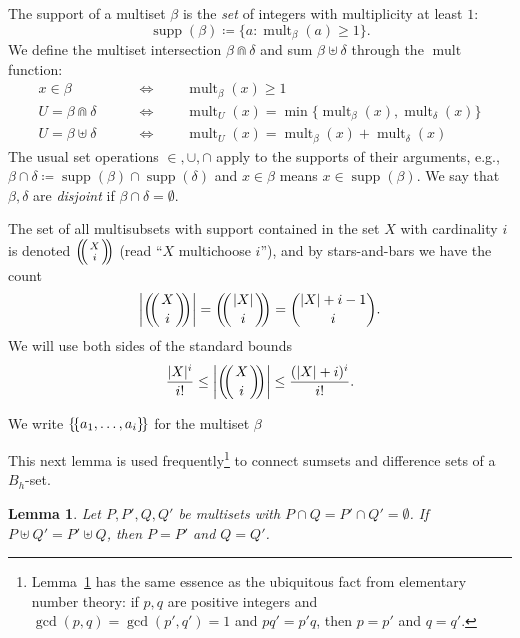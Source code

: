 \documentclass[10pt,letterpaper]{article}
\DeclarePairedDelimiter{\abs}{\lvert}{\rvert}
\DeclarePairedDelimiter{\multi}{\{\!\{}{\}\!\}}
\newcommand{\multibinom}[2]{\left(\kern-0.3em\left(\genfrac{}{}{0pt}{}{#1}{#2}\right)\kern-0.3em\right)}
\DeclareMathOperator{\supp}{supp}
\DeclareMathOperator{\mult}{mult}
\newtheorem{lem}[thm]{Lemma}
\theoremstyle{remark}
\begin{document}
The support of a multiset $\beta$ is the \emph{set} of integers with multiplicity at least $1$:
  \[\supp(\beta) \coloneqq \{ a : \mult_\beta(a)\ge 1\}.\]
We define the multiset intersection $\beta \Cap \delta$ and sum $\beta \uplus \delta$ through the $\mult$ function:
\begin{align*}
  x \in \beta &\qquad \Leftrightarrow\qquad \mult_\beta(x) \ge 1 \\
  U = \beta \Cap \delta &\qquad  \Leftrightarrow\qquad  \mult_U(x) = \min\{\mult_\beta(x),\mult_\delta(x)\} \\
  U = \beta \uplus \delta &\qquad  \Leftrightarrow\qquad  \mult_U(x) = \mult_\beta(x)+\mult_\delta(x) 
\end{align*}  
The usual set operations $\in, \cup, \cap$ apply to the supports of their arguments, e.g., $\beta \cap \delta \coloneqq \supp(\beta) \cap \supp(\delta)$ and $x\in \beta$ means $x\in \supp(\beta)$. We say that $\beta,\delta$ are \emph{disjoint} if $\beta\cap\delta = \emptyset$.

The set of all multisubsets with support contained in the set $X$ with cardinality $i$ is denoted $\multibinom{X}{i}$ (read ``$X$ multichoose $i$''), and by stars-and-bars we have the count
  \[\abs*{\multibinom{X}{i}}= \multibinom{\abs{X}}{i} = \binom{|X|+i-1}{i}.\]
We will use both sides of the standard bounds
  \[ \frac{|X|^i}{i!}\le \abs*{\multibinom{X}{i}} \le \frac{(|X|+i)^i}{i!}.\]

We write $\multi{a_1,\dots,a_i}$ for the multiset $\beta$ 

This next lemma is used frequently\footnote{Lemma~\ref{lem:cancel} has the same essence as the ubiquitous fact from elementary number theory: if $p,q$ are positive integers and $\gcd(p,q)=\gcd(p',q')=1$ and $pq'=p'q$, then $p=p'$ and $q=q'$.} to connect sumsets and difference sets of a $B_h$-set.
\begin{lem}\label{lem:cancel}
Let $P,P',Q,Q'$ be multisets with $P\cap Q=P'\cap Q'=\emptyset$.  If $P\uplus Q'=P'\uplus Q$, then $P=P'$ and $Q=Q'$.
\end{lem}
\end{document}
